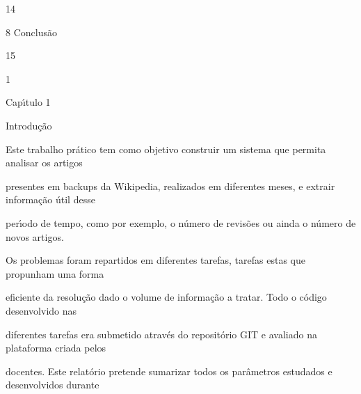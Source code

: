 \documentclass[a4paper,portrait,12pt]{article}
\begin{document}
14





\begin{flushleft}
8 Conclusão
\end{flushleft}





15





1





\begin{flushleft}
\newpage
Cap\i{}́tulo 1
\end{flushleft}





\begin{flushleft}
Introdução
\end{flushleft}


\begin{flushleft}
Este trabalho prático tem como objetivo construir um sistema que permita analisar os artigos
\end{flushleft}


\begin{flushleft}
presentes em backups da Wikipedia, realizados em diferentes meses, e extrair informação útil desse
\end{flushleft}


\begin{flushleft}
per\i{}́odo de tempo, como por exemplo, o número de revisões ou ainda o número de novos artigos.
\end{flushleft}


\begin{flushleft}
Os problemas foram repartidos em diferentes tarefas, tarefas estas que propunham uma forma
\end{flushleft}


\begin{flushleft}
eficiente da resolução dado o volume de informação a tratar. Todo o código desenvolvido nas
\end{flushleft}


\begin{flushleft}
diferentes tarefas era submetido através do repositório GIT e avaliado na plataforma criada pelos
\end{flushleft}


\begin{flushleft}
docentes. Este relatório pretende sumarizar todos os parâmetros estudados e desenvolvidos durante
\end{flushleft}
\end{document}
